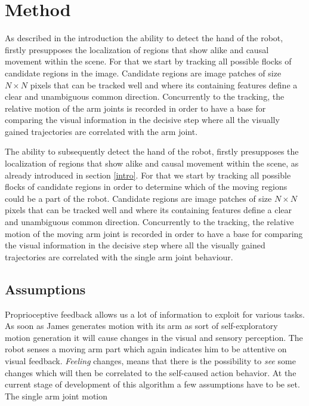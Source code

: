\section{Method}\label{method}
As described in the introduction the ability to detect the hand of the robot, 
firstly presupposes the localization of regions that show alike and causal 
movement within the scene. For that we start by tracking all possible flocks 
of candidate regions in the image. Candidate regions are image patches of 
size $N \times N$ pixels that can be tracked well and where its containing 
features define a clear and unambiguous common direction. Concurrently to 
the tracking, the relative motion of the arm joints is recorded in order 
to have a base for comparing the visual information in the decisive step 
where all the visually gained trajectories are correlated with the arm joint. 

The ability to subsequently detect the hand of the robot, firstly presupposes the localization of regions that show alike and causal movement within the scene, as already introduced in section \ref{intro}. For that we start by tracking all possible flocks of candidate regions in order to determine which of the moving regions could be a part of the robot. Candidate regions are image patches of size $N \times N$ pixels that can be tracked well and where its containing features define a clear and unambiguous common direction. Concurrently to the tracking, the relative motion of the moving arm joint is recorded in order to have a base for comparing the visual information in the decisive step where all the visually gained trajectories are correlated with the single arm joint behaviour. 
%
%

%
%
\subsection{Assumptions}\label{method:localization:assumptions}

Proprioceptive feedback allows us a lot of information to exploit for various 
tasks. As soon as James generates motion with its arm as sort of 
self-exploratory motion generation it will cause changes in the visual and 
sensory perception. The robot senses a moving arm part which again indicates 
him to be attentive on visual feedback. \textit{Feeling} changes, means that 
there is the possibility to \textit{see} some changes which will then be 
correlated to the self-caused action behavior. At the current stage of 
development of this algorithm a few assumptions have to be set. The single 
arm joint motion

